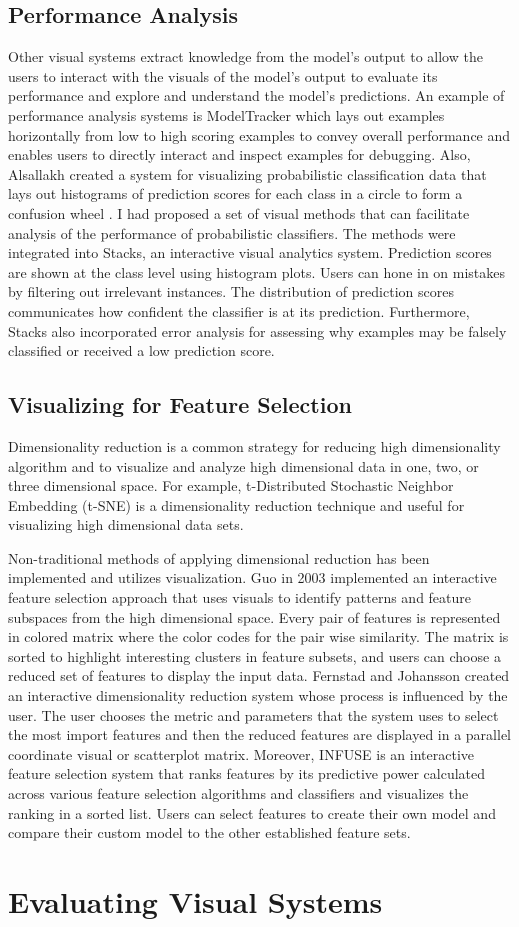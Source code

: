 \subsection{Performance Analysis}
\indent Other visual systems extract knowledge from the model’s output to allow the users to interact with the visuals of the model’s output to evaluate its performance and explore and understand the model’s predictions. An example of performance analysis systems is ModelTracker \cite{ModelTracker} which lays out examples horizontally from low to high scoring examples to convey overall performance and enables users to directly interact and inspect examples for debugging. Also, Alsallakh created a system for visualizing probabilistic classification data that lays out histograms of prediction scores for each class in a circle to form a confusion wheel \cite{}. 
\indent I had proposed a set of visual methods that can facilitate analysis of the performance of probabilistic classifiers. The methods were integrated into Stacks, an interactive visual analytics system. Prediction scores are shown at the class level using histogram plots. Users can hone in on mistakes by filtering out irrelevant instances. The distribution of prediction scores communicates how confident the classifier is at its prediction. Furthermore, Stacks also incorporated error analysis for assessing why examples may be falsely classified or received a low prediction score.

\subsection{Visualizing for Feature Selection}
\indent Dimensionality reduction is a common strategy for reducing high dimensionality algorithm and to visualize and analyze high dimensional data in one, two, or three dimensional space. For example, t-Distributed Stochastic Neighbor Embedding (t-SNE) is a dimensionality reduction technique and useful for visualizing high dimensional data sets. 

Non-traditional methods of applying dimensional reduction has been implemented and utilizes visualization. Guo in 2003 \cite{Guo} implemented an interactive feature selection approach that uses visuals to identify patterns and feature subspaces from the high dimensional space. Every pair of features is represented in colored matrix where the color codes for the pair wise similarity. The matrix is sorted to highlight interesting clusters in feature subsets, and users can choose a reduced set of features to display the input data. Fernstad and Johansson created an interactive dimensionality reduction system \cite{InteractiveDR}whose process is influenced by the user. The user chooses the metric and parameters that the system uses to select the most import features and then the reduced features are displayed in a parallel coordinate visual or scatterplot matrix. Moreover, INFUSE \cite{INFUSE} is an interactive feature selection system that ranks features by its predictive power calculated across various feature selection algorithms and classifiers and visualizes the ranking in a sorted list. Users can select features to create their own model and compare their custom model to the other established feature sets.

\section{Evaluating Visual Systems}